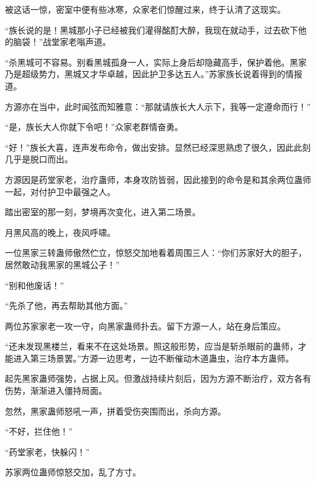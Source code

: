 \begin{this_body}
被这话一惊，密室中便有些冰寒，众家老们惊醒过来，终于认清了这现实。

“族长说的是！黑城那小子已经被我们灌得酩酊大醉，我现在就动手，过去砍下他的脑袋！”战堂家老嗡声道。

“杀黑城可不容易。别看黑城孤身一人，实际上身后却隐藏高手，保护着他。黑家乃是超级势力，黑城又才华卓越，因此护卫多达五人。”苏家族长说着得到的情报道。

方源亦在当中，此时闻弦而知雅意：“那就请族长大人示下，我等一定遵命而行！”

“是，族长大人你就下令吧！”众家老群情奋勇。

“好！”族长大喜，连声发布命令，做出安排。显然已经深思熟虑了很久，因此此刻几乎是脱口而出。

方源因是药堂家老，治疗蛊师，本身攻防皆弱，因此接到的命令是和其余两位蛊师一起，对付护卫中最强之人。

踏出密室的那一刻，梦境再次变化，进入第二场景。

月黑风高的晚上，夜风呼啸。

一位黑家三转蛊师傲然伫立，惊怒交加地看着周围三人：“你们苏家好大的胆子，居然敢动我黑家的黑城公子！”

“别和他废话！”

“先杀了他，再去帮助其他方面。”

两位苏家家老一攻一守，向黑家蛊师扑去。留下方源一人，站在身后策应。

“还未发现黑楼兰，看来不在这处场景。照这般形势，应当是斩杀眼前的蛊师，才能进入第三场景罢。”方源一边思考，一边不断催动木道蛊虫，治疗本方蛊师。

起先黑家蛊师强势，占据上风。但激战持续片刻后，因为方源不断治疗，双方各有伤势，渐渐进入僵持局面。

忽然，黑家蛊师怒吼一声，拼着受伤突围而出，杀向方源。

“不好，拦住他！”

“药堂家老，快躲闪！”

苏家两位蛊师惊怒交加，乱了方寸。

\end{this_body}

